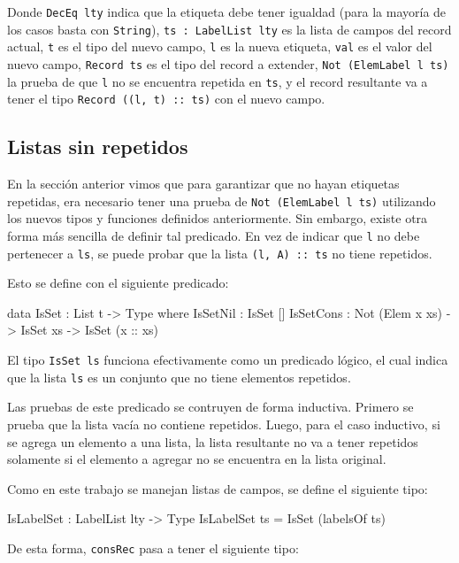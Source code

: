 Donde \texttt{DecEq lty} indica que la etiqueta debe tener igualdad (para la mayoría de los casos basta con \texttt{String}), \texttt{ts : LabelList lty} es la lista de campos del record actual, \texttt{t} es el tipo del nuevo campo, \texttt{l} es la nueva etiqueta, \texttt{val} es el valor del nuevo campo, \texttt{Record ts} es el tipo del record a extender, \texttt{Not (ElemLabel l ts)} la prueba de que \texttt{l} no se encuentra repetida en \texttt{ts}, y el record resultante va a tener el tipo \texttt{Record ((l, t) :: ts)} con el nuevo campo.

\subsection{Listas sin repetidos}

En la sección anterior vimos que para garantizar que no hayan etiquetas repetidas, era necesario tener una prueba de \texttt{Not (ElemLabel l ts)} utilizando los nuevos tipos y funciones definidos anteriormente. Sin embargo, existe otra forma más sencilla de definir tal predicado. En vez de indicar que \texttt{l} no debe pertenecer a \texttt{ls}, se puede probar que la lista \texttt{(l, A) :: ts} no tiene repetidos.

Esto se define con el siguiente predicado:

\begin{code}
data IsSet : List t -> Type where
  IsSetNil : IsSet []
  IsSetCons : Not (Elem x xs) -> IsSet xs ->
    IsSet (x :: xs)
\end{code}

El tipo \texttt{IsSet ls} funciona efectivamente como un predicado lógico, el cual indica que la lista \texttt{ls} es un conjunto que no tiene elementos repetidos.

Las pruebas de este predicado se contruyen de forma inductiva. Primero se prueba que la lista vacía no contiene repetidos. Luego, para el caso inductivo, si se agrega un elemento a una lista, la lista resultante no va a tener repetidos solamente si el elemento a agregar no se encuentra en la lista original.

Como en este trabajo se manejan listas de campos, se define el siguiente tipo:

\begin{code}
IsLabelSet : LabelList lty -> Type
IsLabelSet ts = IsSet (labelsOf ts)
\end{code}

De esta forma, \texttt{consRec} pasa a tener el siguiente tipo:

